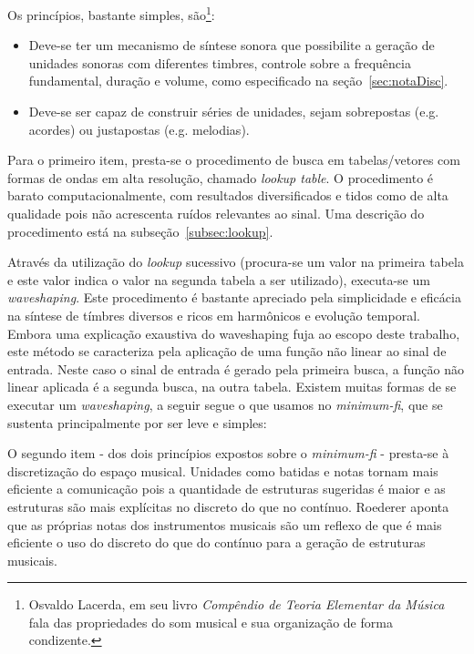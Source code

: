 Os princípios, bastante simples, são\footnote{Osvaldo Lacerda, em seu livro
  \emph{Compêndio de Teoria Elementar da Música} fala das propriedades
  do som musical e sua organização de forma condizente.}:
\begin{itemize}
  \item Deve-se ter um mecanismo de síntese sonora que possibilite a
    geração de unidades sonoras com diferentes timbres, controle sobre
    a frequência fundamental, duração e volume, como especificado na seção~\ref{sec:notaDisc}.
  \item Deve-se ser capaz de construir
    séries de unidades, sejam sobrepostas (e.g. acordes)
    ou justapostas (e.g. melodias).
\end{itemize}

Para o primeiro item, presta-se o procedimento de busca
em tabelas/vetores com formas de ondas em alta resolução, chamado
\emph{lookup table}. O procedimento é barato computacionalmente,
com resultados diversificados e tidos como de alta qualidade
pois não acrescenta ruídos relevantes ao sinal. Uma descrição
do procedimento está na subseção~\ref{subsec:lookup}.

Através da utilização do \emph{lookup} sucessivo (procura-se um valor na primeira tabela
e este valor indica o valor na segunda tabela a ser utilizado), executa-se
um \emph{waveshaping}. Este procedimento é bastante apreciado pela simplicidade e eficácia
na síntese de tímbres diversos e ricos em harmônicos e evolução temporal. Embora
uma explicação exaustiva do waveshaping fuja ao escopo deste trabalho, este
método se caracteriza pela aplicação de uma função não linear ao sinal de entrada.
Neste caso o sinal de entrada é gerado pela primeira busca, a função não linear aplicada
é a segunda busca, na outra tabela.
Existem muitas formas de se executar um \emph{waveshaping}, a seguir segue o que usamos no \emph{minimum-fi}, que se sustenta principalmente por ser leve e simples:


O segundo item - dos dois princípios expostos sobre o \emph{minimum-fi} - presta-se à discretização do espaço musical.
Unidades como batidas e notas
tornam mais eficiente a comunicação pois a quantidade
de estruturas sugeridas é maior e as estruturas são mais explícitas no discreto do que no contínuo. Roederer
aponta que as próprias notas dos instrumentos musicais são um reflexo de que é mais eficiente
o uso do discreto do que do contínuo para a geração de estruturas musicais.\cite{Roederer}

